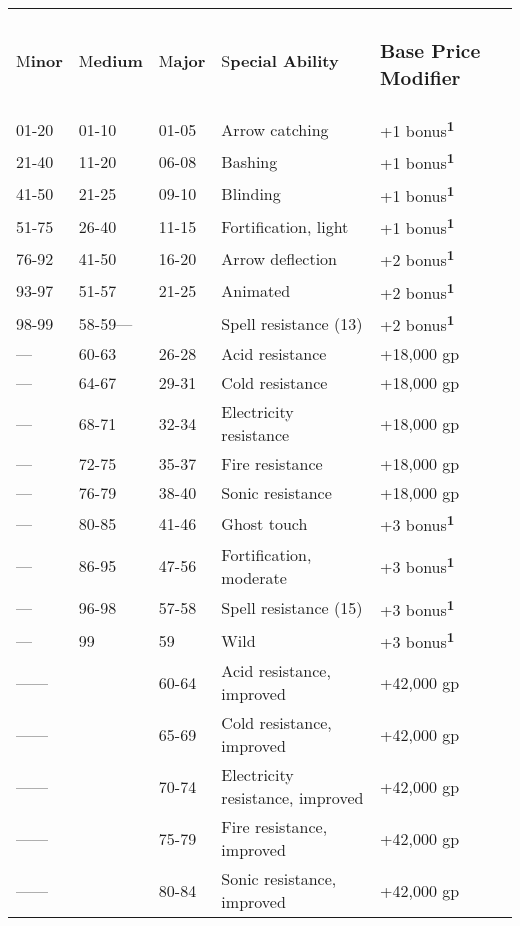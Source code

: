 \documentclass{article}
\begin{document}
\vspace{12pt}
\begin{tabular}{|>{\raggedright}p{29pt}|>{\raggedright}p{36pt}|>{\raggedright}p{30pt}|>{\raggedright}p{116pt}|>{\raggedright}p{77pt}|}
\hline
\multicolumn{5}{|p{290pt}|}{\section*{T\textbf{able: Shield Special Abilities}}}\tabularnewline
\hline
M\textbf{inor} & M\textbf{edium} & M\textbf{ajor} & S\textbf{pecial Ability} & \subsubsection*{B\textbf{ase 
Price Modifier}}\tabularnewline
\hline
01-20 & 01-10 & 01-05 & Arrow catching & +1 bonus\textsuperscript{\textbf{1}}\tabularnewline
\hline
21-40 & 11-20 & 06-08 & Bashing & +1 bonus\textsuperscript{\textbf{1}}\tabularnewline
\hline
41-50 & 21-25 & 09-10 & Blinding & +1 bonus\textsuperscript{\textbf{1}}\tabularnewline
\hline
51-75 & 26-40 & 11-15 & Fortification, light & +1 bonus\textsuperscript{\textbf{1}}\tabularnewline
\hline
76-92 & 41-50 & 16-20 & Arrow deflection & +2 bonus\textsuperscript{\textbf{1}}\tabularnewline
\hline
93-97 & 51-57 & 21-25 & Animated & +2 bonus\textsuperscript{\textbf{1}}\tabularnewline
\hline
98-99 & 58-59--- &  & Spell resistance (13) & +2 bonus\textsuperscript{\textbf{1}}\tabularnewline
\hline
--- & 60-63 & 26-28 & Acid resistance & +18,000 gp\tabularnewline
\hline
--- & 64-67 & 29-31 & Cold resistance & +18,000 gp\tabularnewline
\hline
--- & 68-71 & 32-34 & Electricity resistance & +18,000 gp\tabularnewline
\hline
--- & 72-75 & 35-37 & Fire resistance & +18,000 gp\tabularnewline
\hline
--- & 76-79 & 38-40 & Sonic resistance & +18,000 gp\tabularnewline
\hline
--- & 80-85 & 41-46 & Ghost touch & +3 bonus\textsuperscript{\textbf{1}}\tabularnewline
\hline
--- & 86-95 & 47-56 & Fortification, moderate & +3 bonus\textsuperscript{\textbf{1}}\tabularnewline
\hline
--- & 96-98 & 57-58 & Spell resistance (15) & +3 bonus\textsuperscript{\textbf{1}}\tabularnewline
\hline
--- & 99 & 59 & Wild & +3 bonus\textsuperscript{\textbf{1}}\tabularnewline
\hline
------ &  & 60-64 & Acid resistance, improved & +42,000 gp\tabularnewline
\hline
------ &  & 65-69 & Cold resistance, improved & +42,000 gp\tabularnewline
\hline
------ &  & 70-74 & Electricity resistance, improved & +42,000 gp\tabularnewline
\hline
------ &  & 75-79 & Fire resistance, improved & +42,000 gp\tabularnewline
\hline
------ &  & 80-84 & Sonic resistance, improved & +42,000 gp\tabularnewline

\end{tabular}
\end{document}
